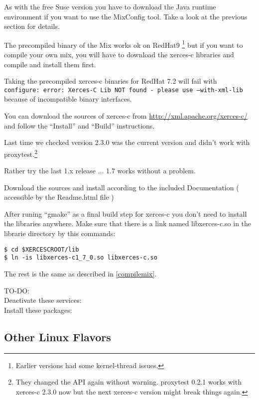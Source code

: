 \documentclass{article}
\begin{document}
As with the free Suse version you have to download the Java runtime
environment if you want to use the MixConfig tool. Take a look at the
previous section for details.

The precompiled binary of the Mix works ok on RedHat9
\footnote{Earlier versions had some kernel-thread issues.} but if you
want to compile your own mix, you will have to download the xerces-c libraries and 
compile and install them first.

Taking the precompiled xerces-c binaries for RedHat 7.2 will fail with\\
\texttt{configure: error: Xerces-C Lib NOT found - please use --with-xml-lib}\\
because of incompatible binary interfaces.

You can download the sources of xerces-c from
\url{http://xml.apache.org/xerces-c/} and follow the ``Install'' and
``Build'' instructions.

Last time we checked version 2.3.0 was the current version and didn't
work with proxytest.\footnote{They changed the API again without
  warning. proxytest 0.2.1 works with xerces-c 2.3.0 now but the next
  xerces-c version might break things again.}

Rather try the last 1.x release ... 1.7 works without a problem.

Download the sources and install according to the included Documentation 
( accessible by the Readme.html file )


After runing ``gmake'' as a final build step for xerces-c you don't
need to install the libraries anywhere. 
Make sure that there is a link named libxerces-c.so in the librarie directory by this commands:

\begin{verbatim}
$ cd $XERCESCROOT/lib
$ ln -is libxerces-c1_7_0.so libxerces-c.so
\end{verbatim}


The rest is the same as described in \ref{compilemix}.

TO-DO: \\
Deactivate these services:\\
Install these packages:\\


\subsection{Other Linux Flavors}
\end{document}
